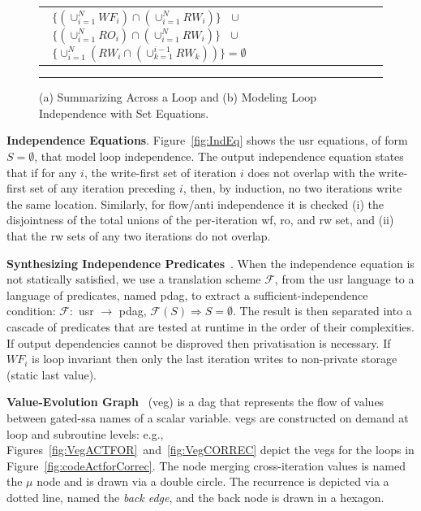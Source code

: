 \documentclass{sig-alternate}
\begin{document}
\begin{figure}[t]
\begin{tabular}{l r}
{{{{$\mbox{ }\{(\cup_{i=1}^{N}WF_i) \cap (\cup_{i=1}^{N}RW_i)\} \mbox{ }\cup\mbox{ }$ \vspace{1ex} \newline
$\mbox{ }\{(\cup_{i=1}^{N}RO_i) \cap (\cup_{i=1}^{N}RW_i)\} \mbox{ }\cup\mbox{ }$ \vspace{1ex} \newline
$\mbox{ }\{ \cup_{i=1}^{N}(RW_i \cap (\cup_{k=1}^{i-1}RW_k))\}=\emptyset$ \newline
}
		}
	  } 
	} 
\end{tabular}
\hrule
\caption{ (a) Summarizing Across a Loop and (b) Modeling Loop Independence with Set Equations.}
\label{fig:UsrEq} %
\end{figure}

\vspace{1ex}

{\bf Independence Equations}. Figure~\ref{fig:IndEq} shows the {\sc usr}
equations, of form $S=\emptyset$, that model loop independence. 
The output independence equation
states that if for any $i$, the write-first set of iteration $i$
does not overlap with the write-first set of any iteration preceding
$i$, then, by induction, no two  iterations write the same %
location. Similarly, for flow/anti independence it is checked 
(i) the disjointness of the total unions of the per-iteration {\sc wf}, 
{\sc ro}, and {\sc rw} set, and (ii) that the {\sc rw} sets of any two 
iterations do not overlap.

\vspace{1ex}

{\bf Synthesizing Independence Predicates}~\cite{CosPLDI}. %
When the independence equation
is not statically satisfied, we use a translation scheme $\mathcal{F}$,
from the {\sc usr} language to a language of %
predicates, named {\sc pdag}, to extract a sufficient-independence condition: 
$\mathcal{F} : $ {\sc usr} $\rightarrow$ {\sc pdag},  
$\mathcal{F}(S) \Rightarrow S = \emptyset$. The result is then separated
into a cascade of predicates that are tested at runtime in the order of 
their complexities.  
If output dependencies cannot be disproved then privatisation is
necessary. If $WF_i$ is loop invariant then only the last iteration 
writes to non-private storage (static last value).

\vspace{1ex}

{\bf Value-Evolution Graph}~\cite{VEG} ({\sc veg}) is a {\sc dag}  %
that represents the flow of values between gated-{\sc ssa} names 
of a scalar variable.  
%
{\sc veg}s are constructed on demand at loop and subroutine levels: 
e.g., Figures~\ref{fig:VegACTFOR}~and~\ref{fig:VegCORREC} depict the 
{\sc veg}s for the loops in Figure~\ref{fig:codeActforCorrec}.
%
The node merging cross-iteration values  is named 
the $\mu$ node and is drawn via a double circle. The recurrence is 
depicted via a dotted line, named the {\em back edge}, and the
back node is drawn in a hexagon.
\end{document}
